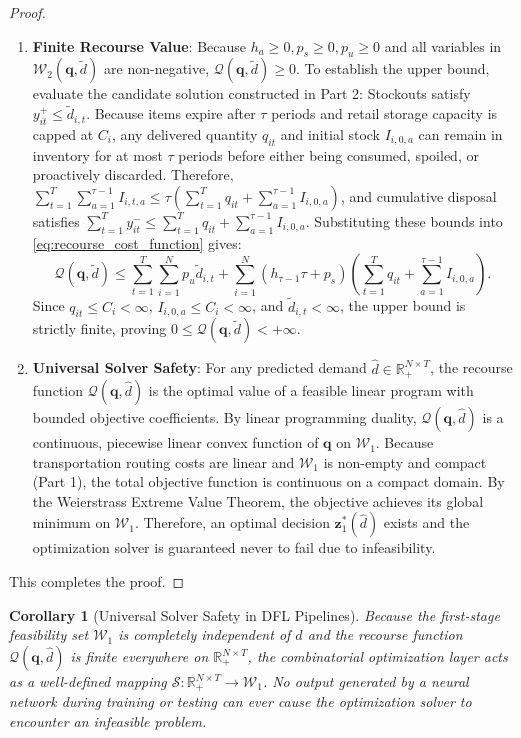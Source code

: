 \documentclass[11pt,a4paper]{article}
\newtheorem{corollary}{Corollary}
\theoremstyle{definition}
\theoremstyle{remark}
\begin{document}
\begin{proof}
\begin{enumerate}[label=\textbf{Part \arabic*.},wide=0pt]
    \item \textbf{Finite Recourse Value}:
    Because $h_a \ge 0, p_s \ge 0, p_u \ge 0$ and all variables in $\mathcal{W}_2(\mathbf{q}, \tilde{d})$ are non-negative, $\mathcal{Q}(\mathbf{q}, \tilde{d}) \ge 0$.
    To establish the upper bound, evaluate the candidate solution constructed in Part 2:
    Stockouts satisfy $y_{it}^+ \le \tilde{d}_{i,t}$.
    Because items expire after $\tau$ periods and retail storage capacity is capped at $C_i$, any delivered quantity $q_{it}$ and initial stock $I_{i,0,a}$ can remain in inventory for at most $\tau$ periods before either being consumed, spoiled, or proactively discarded.
    Therefore, $\sum_{t=1}^T \sum_{a=1}^{\tau-1} I_{i,t,a} \le \tau \left( \sum_{t=1}^T q_{it} + \sum_{a=1}^{\tau-1} I_{i,0,a} \right)$, and cumulative disposal satisfies $\sum_{t=1}^T y_{it}^- \le \sum_{t=1}^T q_{it} + \sum_{a=1}^{\tau-1} I_{i,0,a}$.
    Substituting these bounds into \eqref{eq:recourse_cost_function} gives:
    \begin{equation*}
        \mathcal{Q}(\mathbf{q}, \tilde{d}) \le \sum_{t=1}^T \sum_{i=1}^N p_u \tilde{d}_{i,t} + \sum_{i=1}^N (h_{\tau-1} \tau + p_s) \left( \sum_{t=1}^T q_{it} + \sum_{a=1}^{\tau-1} I_{i,0,a} \right).
    \end{equation*}
    Since $q_{it} \le C_i < \infty$, $I_{i,0,a} \le C_i < \infty$, and $\tilde{d}_{i,t} < \infty$, the upper bound is strictly finite, proving $0 \le \mathcal{Q}(\mathbf{q}, \tilde{d}) < +\infty$.

    \item \textbf{Universal Solver Safety}:
    For any predicted demand $\hat{d} \in \mathbb{R}_+^{N \times T}$, the recourse function $\mathcal{Q}(\mathbf{q}, \hat{d})$ is the optimal value of a feasible linear program with bounded objective coefficients. By linear programming duality, $\mathcal{Q}(\mathbf{q}, \hat{d})$ is a continuous, piecewise linear convex function of $\mathbf{q}$ on $\mathcal{W}_1$.
    Because transportation routing costs are linear and $\mathcal{W}_1$ is non-empty and compact (Part 1), the total objective function is continuous on a compact domain. By the Weierstrass Extreme Value Theorem, the objective achieves its global minimum on $\mathcal{W}_1$. Therefore, an optimal decision $\mathbf{z}_1^*(\hat{d})$ exists and the optimization solver is guaranteed never to fail due to infeasibility.
\end{enumerate}
This completes the proof.
\end{proof}

\begin{corollary}[Universal Solver Safety in DFL Pipelines]
\label{cor:safety}
Because the first-stage feasibility set $\mathcal{W}_1$ is completely independent of $\hat{d}$ and the recourse function $\mathcal{Q}(\mathbf{q}, \hat{d})$ is finite everywhere on $\mathbb{R}_+^{N \times T}$, the combinatorial optimization layer acts as a well-defined mapping $\mathcal{S}: \mathbb{R}_+^{N \times T} \to \mathcal{W}_1$. No output generated by a neural network during training or testing can ever cause the optimization solver to encounter an infeasible problem.
\end{corollary}
\end{document}
